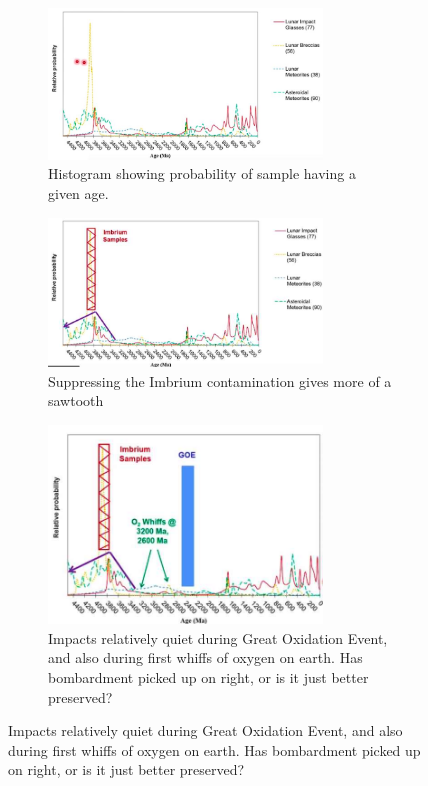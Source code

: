 \documentclass[]{article}
\begin{document}
\begin{figure}[H]
	\caption{Lunar Flux as a function of Age}\label{fig:LunarFlux}
	\begin{subfigure}[t]{0.30\textwidth}
		\caption{Histogram showing probability of sample having a given age.}
		\includegraphics[width=0.8\textwidth]{LunarFlux0}
	\end{subfigure}
	\;
	\begin{subfigure}[t]{0.30\textwidth}
		\caption{Suppressing the Imbrium contamination gives more of a sawtooth}
		\includegraphics[width=0.8\textwidth]{LunarFluxWithoutImbrium}
	\end{subfigure}
	\;
	\begin{subfigure}[t]{0.30\textwidth}
		\caption{Impacts relatively quiet during Great Oxidation Event, and also during first whiffs of oxygen on earth. Has bombardment picked up on right, or is it just better preserved?}
		\includegraphics[width=0.8\textwidth]{LunarGOE}
	\end{subfigure}
\end{figure}
\end{document}
